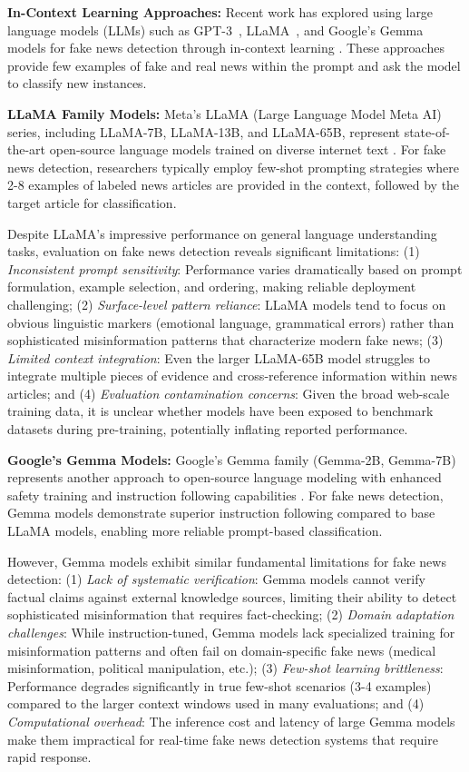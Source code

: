 \textbf{In-Context Learning Approaches:} Recent work has explored using large language models (LLMs) such as GPT-3~\cite{openai2023gpt4}, LLaMA~\cite{touvron2023llama}, and Google's Gemma models for fake news detection through in-context learning \cite{chen2023combating}. These approaches provide few examples of fake and real news within the prompt and ask the model to classify new instances.

\textbf{LLaMA Family Models:} Meta's LLaMA (Large Language Model Meta AI) series, including LLaMA-7B, LLaMA-13B, and LLaMA-65B, represent state-of-the-art open-source language models trained on diverse internet text \cite{touvron2023llama}. For fake news detection, researchers typically employ few-shot prompting strategies where 2-8 examples of labeled news articles are provided in the context, followed by the target article for classification.

Despite LLaMA's impressive performance on general language understanding tasks, evaluation on fake news detection reveals significant limitations: (1) \emph{Inconsistent prompt sensitivity}: Performance varies dramatically based on prompt formulation, example selection, and ordering, making reliable deployment challenging; (2) \emph{Surface-level pattern reliance}: LLaMA models tend to focus on obvious linguistic markers (emotional language, grammatical errors) rather than sophisticated misinformation patterns that characterize modern fake news; (3) \emph{Limited context integration}: Even the larger LLaMA-65B model struggles to integrate multiple pieces of evidence and cross-reference information within news articles; and (4) \emph{Evaluation contamination concerns}: Given the broad web-scale training data, it is unclear whether models have been exposed to benchmark datasets during pre-training, potentially inflating reported performance.

\textbf{Google's Gemma Models:} Google's Gemma family (Gemma-2B, Gemma-7B) represents another approach to open-source language modeling with enhanced safety training and instruction following capabilities \cite{team2024gemma}. For fake news detection, Gemma models demonstrate superior instruction following compared to base LLaMA models, enabling more reliable prompt-based classification.

However, Gemma models exhibit similar fundamental limitations for fake news detection: (1) \emph{Lack of systematic verification}: Gemma models cannot verify factual claims against external knowledge sources, limiting their ability to detect sophisticated misinformation that requires fact-checking; (2) \emph{Domain adaptation challenges}: While instruction-tuned, Gemma models lack specialized training for misinformation patterns and often fail on domain-specific fake news (medical misinformation, political manipulation, etc.); (3) \emph{Few-shot learning brittleness}: Performance degrades significantly in true few-shot scenarios (3-4 examples) compared to the larger context windows used in many evaluations; and (4) \emph{Computational overhead}: The inference cost and latency of large Gemma models make them impractical for real-time fake news detection systems that require rapid response.

